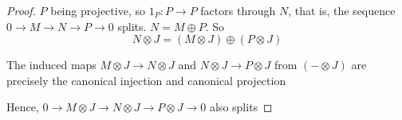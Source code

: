 \begin{proof}
	$P$ being projective, so $1_P: P \to P$ factors through $N$, that is, the sequence $0 \to M \to N \to P \to 0$ splits. $N = M \oplus P$. So 
	$$
		N \otimes J  = (M \otimes J) \oplus (P \otimes J)
	$$
	
	The induced maps $M \otimes J \to N \otimes J$ and $N \otimes J \to P \otimes J$ from $(- \otimes J)$ are precisely the canonical injection and canonical projection

	\begin{center}
	\end{center}
	
	Hence, $0 \to M \otimes J \to N \otimes J \to P \otimes J \to 0$ also splits
\end{proof}

